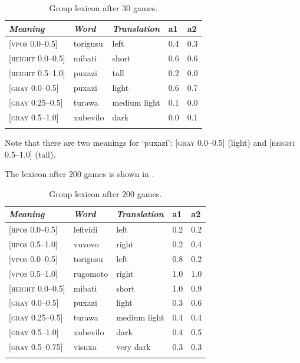 \begin{table} 
\begin{center}
\begin{tabular}{ l  l  l  l  l }
\lsptoprule
{\itshape Meaning}&{\itshape Word}&{\itshape Translation} & {\bfshape  a1}&{\bfshape  a2} \\ \midrule
{}[\textsc{vpos} 0.0–0.5] &torigusu&left&0.4&0.3\\ 
{}[\textsc{height} 0.0–0.5]&mibati&short &0.6&0.6\\ 
{}[\textsc{height} 0.5–1.0]&puxazi&tall &0.2&0.0\\ 
{}[\textsc{gray} 0.0–0.5]& puxazi&light &0.6&0.7\\ 
{}[\textsc{gray} 0.25–0.5]&turawa&medium light&0.1&0.0\\ 
{}[\textsc{gray} 0.5–1.0]& xubevilo&dark &0.0&0.1\\ 
\lspbottomrule
\end{tabular}
\caption{\label{tab:after30}Group lexicon after 30 games.}
\end{center}
\end{table}

Note that there are two meanings for `puxazi': 
{}[\textsc{gray} 0.0–0.5] (light) and [\textsc{height} 0.5–1.0] (tall). 

The lexicon after 200 games is shown in . 


\begin{table} 
\begin{center}
\begin{tabular}{ l  l  l  l  l }
\lsptoprule
{\itshape Meaning}&{\itshape Word}&{\itshape Translation} & {\bfshape  a1}&{\bfshape  a2} \\ \midrule
{}[\textsc{hpos} 0.0–0.5] &lefividi&left&0.2&0.2\\ 
{}[\textsc{hpos} 0.5–1.0] &vuvovo&right&0.2&0.4\\ 
{}[\textsc{vpos} 0.0–0.5] &torigusu&left&0.8&0.2\\ 
{}[\textsc{vpos} 0.5–1.0] &rugomoto&right&1.0&1.0\\ 
{}[\textsc{height} 0.0–0.5]&mibati&short &1.0&0.9\\ 
{}[\textsc{gray} 0.0–0.5]& puxazi&light &0.3&0.6\\ 
{}[\textsc{gray} 0.25–0.5]&turawa&medium light&0.4&0.4\\ 
{}[\textsc{gray} 0.5–1.0]& xubevilo&dark &0.4&0.5\\ 
{}[\textsc{gray} 0.5–0.75]& visuxa&very dark &0.3&0.3\\ 
\lspbottomrule
\end{tabular}
\caption{\label{tab:after200}Group lexicon after 200 games.}
\end{center}
\end{table}

